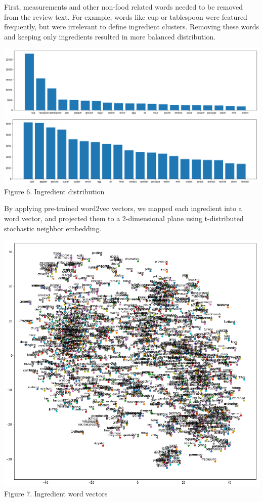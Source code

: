 \documentclass[11pt]{article}
\begin{document}
First, measurements and other non-food related words needed to be removed from the review text. For example, words like cup or tablespoon were featured frequently, but were irrelevant to define ingredient clusters. Removing these words and keeping only ingredients resulted in more balanced distribution.

\vspace{5mm}
\begin{center}
\includegraphics[scale=0.18]{ingredient-before}
\includegraphics[scale=0.18]{ingredient-after}
\label{visalization-cookingtime} Figure 6. Ingredient distribution
\end{center}
\vspace{5mm}

By applying pre-trained word2vec vectors, we mapped each ingredient into a word vector, and projected them to a 2-dimensional plane using t-distributed stochastic neighbor embedding. 

\vspace{5mm}
\begin{center}
\includegraphics[scale=0.24]{ingredient-tsne}
\label{visalization-cookingtime} Figure 7. Ingredient word vectors
\end{center}
\vspace{5mm}
\end{document}
